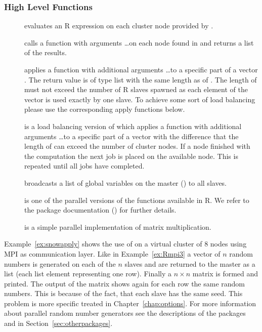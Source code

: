 \subsubsection{High Level Functions}
\begin{description}
\item[] evaluates an R expression
   on
  each cluster node provided by . 
\item[] calls a function
   with arguments \ldots on each node found in 
  and returns a list of the results.
\item[] applies a function
   with additional arguments \ldots to a specific part of
  a vector . The return value is of type list with the same
  length as of . The length of
   must not exceed the 
  number of R slaves spawned as each element of the vector is used
  exactly by one slave. To achieve some sort of load balancing please
  use the corresponding apply functions below.
\item[] is a load balancing
  version of  which applies a function
   with additional arguments \ldots to a specific part of
  a vector  with the difference that the length of
   can exceed the number of cluster nodes. If a node
  finished with the computation the next job is placed on the
  available node. This is repeated until all jobs have completed.
\item[] broadcasts a list of global
  variables on the master () to all slaves.
\item[] is one of the parallel
  versions of the  functions available in R. We refer to
  the package documentation (\cite{tierney07snow}) for further details.
\item[] is a simple parallel implementation of
  matrix multiplication. 
\end{description}

Example~\ref{ex:snowapply} shows the use of  on a
virtual cluster of 8 nodes using MPI as communication layer. Like in
Example~\ref{ex:Rmpi3} a vector of $n$ random numbers is generated on
each of the $n$ slaves and are returned to the master as a
list (each list element representing one row). Finally a $n  \times n$
matrix is formed and printed. The output of the matrix shows again for
each row the same random numbers. This is because of the fact, that
each slave has the same seed. This problem is more specific treated in
Chapter~\ref{chap:options}. For more information about parallel random
number generators see the descriptions of the packages 
and  in Section~\ref{sec:otherpackages}. 

